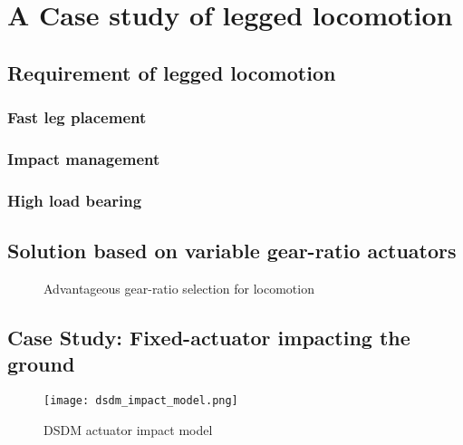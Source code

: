 \chapter{A Case study of legged locomotion}
\label{sec:casestudy}


\section{Requirement of legged locomotion}
\label{sec:case_req}

\subsection{Fast leg placement}
\label{sec:fast}

\subsection{Impact management}
\label{sec:impact}

\subsection{High load bearing}
\label{sec:load}


\section{Solution based on variable gear-ratio actuators}
\label{sec:case_sol}

\begin{figure}[H]
        \centering
        \caption{Advantageous gear-ratio selection for locomotion}\label{fig:legsol}
\end{figure}







\section{Case Study: Fixed-actuator impacting the ground}

\begin{figure}[H]
	\centering
		\texttt{[image: dsdm\_impact\_model.png]}
	\caption{DSDM actuator impact model}
	\label{fig:dsdm_impact_model_1}
\end{figure}


